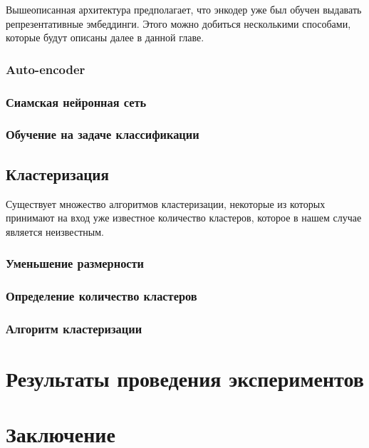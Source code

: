 Вышеописанная архитектура предполагает, что энкодер уже был обучен выдавать репрезентативные эмбеддинги. Этого можно добиться несколькими способами, которые будут описаны далее в данной главе.

\subsubsection{Auto-encoder}

\subsubsection{Сиамская нейронная сеть}

\subsubsection{Обучение на задаче классификации}

\subsection{Кластеризация}

Существует множество алгоритмов кластеризации, некоторые из которых принимают на вход уже известное количество кластеров, которое в нашем случае является неизвестным.

\subsubsection{Уменьшение размерности}

\subsubsection{Определение количество кластеров}

\subsubsection{Алгоритм кластеризации}

\section{Результаты проведения экспериментов}

\section{Заключение}
